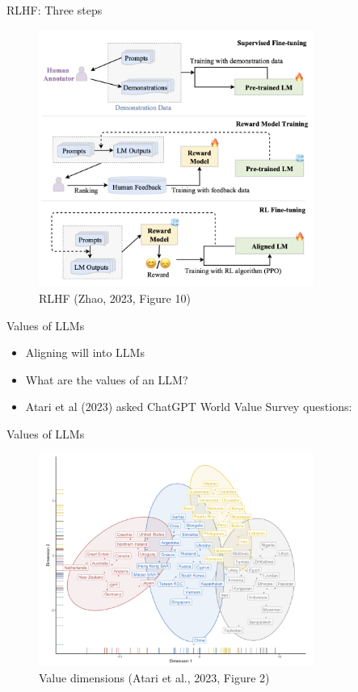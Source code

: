 \documentclass[10pt]{beamer}
\begin{document}
\begin{frame}{RLHF: Three steps}

\begin{figure}[h]
\centering
\includegraphics[width=0.8\textwidth]{fig/zhao_2023_fig10}
\caption{RLHF (Zhao, 2023, Figure 10)}
\end{figure}

\end{frame}


\begin{frame}{Values of LLMs}

\begin{itemize}
\item Aligning will  into LLMs
\pause
\item What are the values of an LLM?
\pause
\item Atari et al (2023) asked ChatGPT World Value Survey questions:
\end{itemize}

\end{frame}


\begin{frame}{Values of LLMs}

\begin{figure}[h]
\centering
\includegraphics[width=0.8\textwidth]{fig/atari_2023_fig2}
\caption{Value dimensions (Atari et al., 2023, Figure 2)}
\end{figure}

\end{frame}
\end{document}

